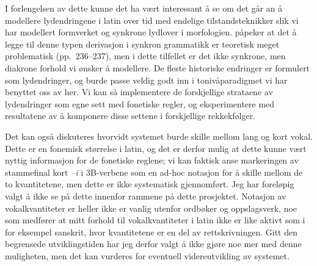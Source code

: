 \documentclass{article}
\let\w\emph
\begin{document}
I forlengelsen av dette kunne det ha v\ae{}rt interessant \aa{} se om det
g\aa{}r an \aa{} modellere lydendringene i latin over tid med endelige
tilstandsteknikker slik vi har modellert formverket og synkrone lydlover i
morfologien.  p\aa{}peker at det \aa{} legge til denne typen
derivasjon i synkron grammatikk er teoretisk meget problematisk
(pp.~236--237), men i dette tilfellet er det ikke synkrone, men diakrone
forhold vi \o{}nsker \aa{} modellere. De fleste historiske endringer er
formulert som lydendringer, og burde passe veldig godt inn i
toniv\aa{}paradigmet vi har benyttet oss av her. Vi kan s\aa{} implementere de
forskjellige strataene av lydendringer som egne sett med fonetiske regler, og
eksperimentere med resultatene av \aa{} komponere disse settene i forskjellige
rekkekf\o{}lger.

Det kan ogs\aa{} diskuteres hvorvidt systemet burde skille mellom lang og kort
vokal. Dette er en fonemisk st\o{}rrelse i latin, og det er derfor mulig at
dette kunne v\ae{}rt nyttig informasjon for de fonetiske reglene; vi kan
faktisk anse markeringen av stammefinal kort \w{--i} i 3B-verbene som en
ad-hoc notasjon for \aa{} skille mellom de to kvantitetene, men dette er ikke
systematisk gjennomf\o{}rt. Jeg har forel\o{}pig valgt \aa{} ikke se p\aa{}
dette innenfor rammene p\aa{} dette prosjektet. Notasjon av vokalkvantiteter
er heller ikke er vanlig utenfor ordb\o{}ker og oppslagsverk, noe som
medf\o{}rer at mitt forhold til vokalkvantiteter i latin ikke er like aktivt
som i for eksempel sanskrit, hvor kvantitetene er en del av rettskrivningen.
Gitt den begrensede utviklingstiden har jeg derfor valgt \aa{} ikke gj\o{}re
noe mer med denne muligheten, men det kan vurderes for eventuell
videreutvikling av systemet.

\clearpage

{}


\clearpage
\appendix
\end{document}
